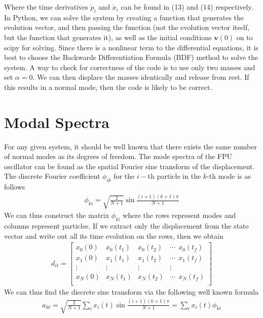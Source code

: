 \documentclass{article}
\newcommand{\ve}{\mathbf}
\begin{document}
Where the time derivatives $\dot{p}_i$ and $\dot{x}_i$ can be found in (13) and (14) respectively. In Python, 
we can solve the system by creating a function that generates the evolution vector, 
and then passing the function (not the evolution vector itself, but the function that generates it), as well as the initial conditions 
$\ve{v}(0)$ on to 
scipy for solving. Since there is a nonlinear term to the differential equations, 
it is best to choose the Backwards Differentiation Formula (BDF) method to solve the system. 
A way to check for correctness of the code is to use only two masses and set 
$\alpha=0$. We can then 
displace the masses identically and release from rest. If this results in a normal mode, then the code is likely to be correct.

\section{Modal Spectra}
For any given system, it should be well known that there exists the same number of normal modes 
as its degrees of freedom. The mode spectra of the FPU oscillator can be found as the spatial Fourier sine 
transform of the displacement. The discrete Fourier coefficient $\phi_{ik}$ for the 
$i-$th particle in the $k$-th mode is as follows
\begin{align}
    \phi_{ki}=\sqrt{\frac{2}{N+1}}\sin\frac{(i+1)(k+1)\pi}{N+1}
\end{align}
We can thus construct the matrix $\phi_{ki}$ where the rows represent modes and 
columns represent particles. If we extract only the displacement from the state vector
and write out all its time evolution on the rows, then we obtain 
\begin{align}
    d_{it}=\begin{bmatrix}
        x_0(0)& x_0(t_1) & x_0(t_2) &\cdots \ \  x_0(t_f)\\ 
        x_1(0)& x_1(t_1) & x_1(t_2) &\cdots \ \  x_1(t_f)\\ 
       \vdots& \vdots & \vdots & \vdots\\ 
        x_N(0)& x_N(t_1) & x_N(t_2) &\cdots \ \ x_N(t_f)\\ 
    \end{bmatrix}
\end{align} 
We can thus find the discrete sine transform via the following well known formula 
\begin{align}
    a_{kt}=\sqrt{\frac{2}{N+1}}\sum_ix_i(t)\sin{\frac{(i+1)(k+1)\pi}{N+1}}=\sum_ix_{i}(t)\phi_{ki}
\end{align}
\end{document}
